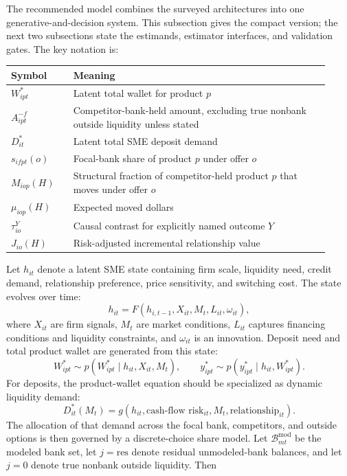 \documentclass[11pt]{article}
\begin{document}
The recommended model combines the surveyed architectures into one
generative-and-decision system. This subsection gives the compact version; the
next two subsections state the estimands, estimator interfaces, and validation
gates. The key notation is:
\begin{center}
\footnotesize
\begin{tabular}{@{}p{0.18\linewidth}p{0.74\linewidth}@{}}
\toprule
Symbol & Meaning \\
\midrule
$W_{ipt}^{*}$ & Latent total wallet for product $p$ \\
$A_{ipt}^{-f}$ & Competitor-bank-held amount, excluding true nonbank outside liquidity unless stated \\
$D_{it}^{*}$ & Latent total SME deposit demand \\
$s_{ifpt}(o)$ & Focal-bank share of product $p$ under offer $o$ \\
$M_{iop}(H)$ & Structural fraction of competitor-held product $p$ that moves under offer $o$ \\
$\mu_{iop}(H)$ & Expected moved dollars \\
$\tau_{io}^{Y}$ & Causal contrast for explicitly named outcome $Y$ \\
$J_{io}(H)$ & Risk-adjusted incremental relationship value \\
\bottomrule
\end{tabular}
\end{center}
Let $h_{it}$ denote a latent SME state containing
firm scale, liquidity need, credit demand, relationship preference, price
sensitivity, and switching cost. The state evolves over time:
\[
  h_{it}
  =
  F(h_{i,t-1},X_{it},M_t,L_{it},\omega_{it}),
\]
where $X_{it}$ are firm signals, $M_t$ are market conditions, $L_{it}$ captures
financing conditions and liquidity constraints, and $\omega_{it}$ is an
innovation. Deposit need and total product wallet are generated from this state:
\[
  W_{ipt}^{*} \sim p(W_{ipt}^{*}\mid h_{it},X_{it},M_t),
  \qquad
  y_{ipt}^{*} \sim p(y_{ipt}^{*}\mid h_{it},W_{ipt}^{*}).
\]
For deposits, the product-wallet equation should be specialized as dynamic
liquidity demand:
\[
  D_{it}^{*}(M_t)
  =
  g(h_{it},\text{cash-flow risk}_{it},M_t,\text{relationship}_{it}).
\]
The allocation of that demand across the focal bank, competitors, and outside
options is then governed by a discrete-choice share model. Let
$\mathcal{B}_{mt}^{\mathrm{mod}}$ be the modeled bank set, let
$j=\mathrm{res}$ denote residual unmodeled-bank balances, and let $j=0$ denote
true nonbank outside liquidity. Then
\end{document}
